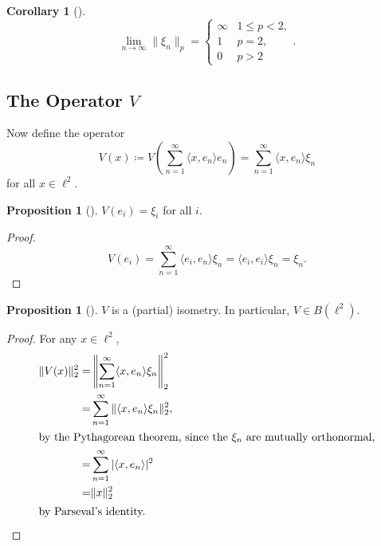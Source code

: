 \documentclass{dcthesis}
\numberwithin{equation}{section}
\numberwithin{equation}{section}
\theoremstyle{definition}
\newtheorem{proposition}[equation]{Proposition}
\newtheorem{corollary}[equation]{Corollary}
\begin{document}
\begin{corollary}[]
	\begin{equation*}
		\lim_{n\to\infty}\|\xi_n\|_p =
		\begin{cases}
			\infty & 1\leq p < 2, \\
			1 & p = 2, \\
			0 & p > 2
		\end{cases}.
	\end{equation*}
\end{corollary}


\subsection{The Operator $V$} %

Now define the operator 
\begin{equation*}
	V(x) \coloneqq V\left(\sum_{n=1}^\infty \langle x, e_n\rangle e_n\right) = \sum_{n=1}^\infty \langle x, e_n\rangle \xi_n
\end{equation*}
for all $x\in \ell^2$. 

\begin{proposition}[]
	$V(e_i)=\xi_i$ for all $i$.
\end{proposition}

\begin{proof}
	\begin{equation*}
		V(e_i)=\sum_{n=1}^\infty\langle e_i,e_n\rangle \xi_n=\langle e_i,e_i\rangle \xi_n=\xi_n.
	\end{equation*}
\end{proof}

\begin{proposition}[]
	$V$ is a (partial) isometry. In particular, $V\in B(\ell^2)$.
\end{proposition}

\begin{proof}
	For any $x\in\ell^2$,
	\begin{align*}
		\|V(x)\|_2^2 
		=& \left\|\sum_{n=1}^\infty \langle x,e_n\rangle \xi_n\right\|_2^2 \\
		=& \sum_{n=1}^\infty \|\langle x,e_n\rangle \xi_n\|_2^2, \\
		\intertext{by the Pythagorean theorem, since the $\xi_n$ are mutually orthonormal,}
		=& \sum_{n=1}^\infty |\langle x,e_n\rangle |^2 \\
		=& \|x\|_2^2 \\
		\intertext{by Parseval's identity.}
	\end{align*}
\end{proof}
\end{document}
